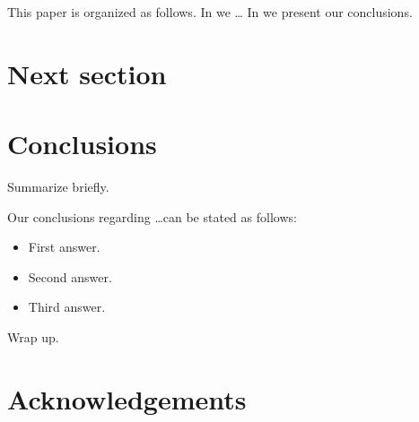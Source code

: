 \documentclass[useAMS,usenatbib]{mn2e}
\begin{document}
This paper is organized as follows. In  we \ldots
In  we present our conclusions.



\section{Next section}
\label{sec:next}



\section{Conclusions}
\label{sec:conclude}

Summarize briefly.

Our conclusions regarding \ldots can be stated as follows:

\begin{itemize}

\item First answer.

\item Second answer. 

\item Third answer. 

\end{itemize}

Wrap up.



\section*{Acknowledgements}







\label{lastpage}
\bsp
\end{document}
